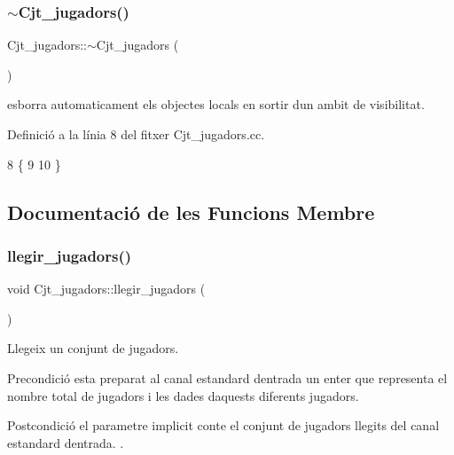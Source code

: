 \subsubsection{\texorpdfstring{$\sim$\+Cjt\+\_\+jugadors()}{~Cjt\_jugadors()}}
{\footnotesize\ttfamily Cjt\+\_\+jugadors\+::$\sim$\+Cjt\+\_\+jugadors (\begin{DoxyParamCaption}{ }\end{DoxyParamCaption})}



esborra automaticament els objectes locals en sortir d\textquotesingle{}un ambit de visibilitat. 



Definició a la línia 8 del fitxer Cjt\+\_\+jugadors.\+cc.


\begin{DoxyCode}
8                             \{
9         
10 \}
\end{DoxyCode}


\subsection{Documentació de les Funcions Membre}
\mbox{\label{class_cjt__jugadors_affe03f05c962b8689540de5e1aa97d0a}} 
\subsubsection{\texorpdfstring{llegir\+\_\+jugadors()}{llegir\_jugadors()}}
{\footnotesize\ttfamily void Cjt\+\_\+jugadors\+::llegir\+\_\+jugadors (\begin{DoxyParamCaption}{ }\end{DoxyParamCaption})}



Llegeix un conjunt de jugadors. 

\begin{DoxyPrecond}{Precondició}
esta preparat al canal estandard d\textquotesingle{}entrada un enter que representa el nombre total de jugadors i les dades d\textquotesingle{}aquests diferents jugadors. 
\end{DoxyPrecond}
\begin{DoxyPostcond}{Postcondició}
el parametre implicit conte el conjunt de jugadors llegits del canal estandard d\textquotesingle{}entrada. . 
\end{DoxyPostcond}



